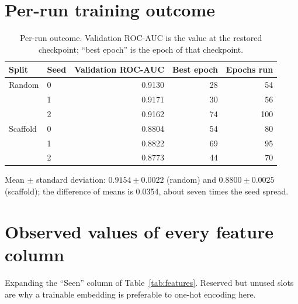 \documentclass[10pt]{article}
\begin{document}
\clearpage
\appendix

\section{Per-run training outcome}
\label{app:seeds}

\begin{table}[H]
    \centering
    \caption{Per-run outcome. Validation ROC-AUC is the value at the restored checkpoint; ``best epoch'' is the epoch of that checkpoint.}
    \label{tab:seeds}
    \footnotesize
    \begin{tabular}{llrrr}
        \toprule
        Split & Seed & Validation ROC-AUC & Best epoch & Epochs run \\
        \midrule
        Random   & 0 & 0.9130 & 28 &  54 \\
                 & 1 & 0.9171 & 30 &  56 \\
                 & 2 & 0.9162 & 74 & 100 \\
        \midrule
        Scaffold & 0 & 0.8804 & 54 &  80 \\
                 & 1 & 0.8822 & 69 &  95 \\
                 & 2 & 0.8773 & 44 &  70 \\
        \bottomrule
    \end{tabular}
\end{table}

Mean $\pm$ standard deviation: $0.9154 \pm 0.0022$ (random) and $0.8800 \pm 0.0025$ (scaffold); the difference of
means is 0.0354, about seven times the seed spread.

\section{Observed values of every feature column}
\label{app:vocab}

Expanding the ``Seen'' column of Table~\ref{tab:features}. Reserved but unused slots are why a trainable embedding is
preferable to one-hot encoding here.
\end{document}
